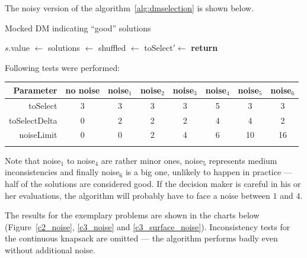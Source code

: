 The noisy version of the algorithm~\ref{alg:dmselection} is shown below.
\begin{algorithm}
\caption{Mocked DM indicating ``good'' solutions}\label{alg:noisydmselection}
  \begin{algorithmic}[1]
    \State $s.$value $\gets$ 
    \EndFor
    \State solutions $\gets$ 
    \State shuffled $\gets$ 
    \State toSelect$' \gets$ 
    \State \textbf{return} 
    \EndProcedure
  \end{algorithmic}
\end{algorithm}

Following tests were performed:

\begin{tabular}{r c c c c c c c}
  \hline
  Parameter & no noise & noise$_1$ & noise$_2$ & noise$_3$ & noise$_4$ &
  noise$_5$ & noise$_6$ \\
  \hline
  \hline
  toSelect      & 3 & 3 & 3 & 3 & 5 &  3 &  3 \\
  toSelectDelta & 0 & 2 & 2 & 2 & 4 &  4 &  2 \\
  noiseLimit    & 0 & 0 & 2 & 4 & 6 & 10 & 16 \\
  \hline \\
\end{tabular}

Note that noise$_1$ to noise$_4$ are rather minor ones, noise$_5$ represents
medium inconsistencies and finally noise$_6$ is a big one, unlikely to happen
in practice --- half of the solutions are considered good. If the decision
maker is careful in his or her evaluations, the algorithm will probably have
to face a noise between $1$ and $4$.

The results for the exemplary problems are shown in the charts below
(Figure~\ref{c2_noise}, \ref{c3_noise} and
\ref{c3_surface_noise}). Inconsistency tests for the continuous knapsack are
omitted --- the algorithm performs badly even without additional noise.


